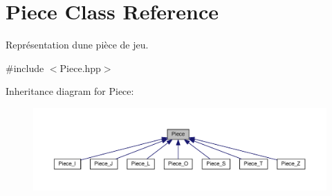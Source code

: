 \hypertarget{classPiece}{}\section{Piece Class Reference}
\label{classPiece}


Représentation d\textquotesingle{}une pièce de jeu.  




{\ttfamily \#include $<$Piece.\+hpp$>$}



Inheritance diagram for Piece\+:
\nopagebreak
\begin{figure}[H]
\begin{center}
\leavevmode
\includegraphics[width=350pt]{classPiece__inherit__graph}
\end{center}
\end{figure}

